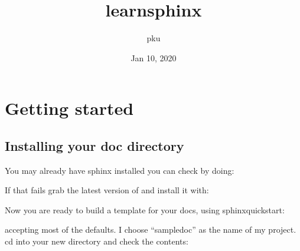 \documentclass[letterpaper,10pt,english]{sphinxmanual}
\title{learn\sphinxhyphen{}sphinx}
\date{Jan 10, 2020}
\author{pku}
\begin{document}
\pagestyle{empty}
\sphinxmaketitle
\pagestyle{plain}
\sphinxtableofcontents
\pagestyle{normal}
\label{\detokenize{index::doc}}



\chapter{Getting started}
\label{\detokenize{chapter1:getting-started}}\label{\detokenize{chapter1:id1}}\label{\detokenize{chapter1::doc}}

\section{Installing your doc directory}
\label{\detokenize{chapter1:installing-your-doc-directory}}\label{\detokenize{chapter1:installing-docdir}}
You may already have sphinx 
installed \textendash{} you can check by doing:

\begin{sphinxVerbatim}[commandchars=\\\{\}]
  
\end{sphinxVerbatim}

If that fails grab the latest version of and install it with:

\begin{sphinxVerbatim}[commandchars=\\\{\}]
    
\end{sphinxVerbatim}

Now you are ready to build a template for your docs, using
sphinx\sphinxhyphen{}quickstart:

\begin{sphinxVerbatim}[commandchars=\\\{\}]
 
\end{sphinxVerbatim}

accepting most of the defaults.  I choose “sampledoc” as the name of my
project.  cd into your new directory and check the contents:

\begin{sphinxVerbatim}[commandchars=\\\{\}]
 
               
               
\end{sphinxVerbatim}
\end{document}
